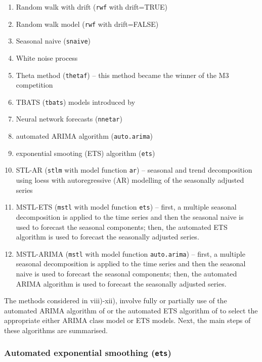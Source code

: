 \documentclass{monashthesis}
\begin{document}
\begin{enumerate}
\def\labelenumi{\roman{enumi})}
\tightlist
\item
  Random walk with drift (\texttt{rwf} with drift=TRUE)
\item
  Random walk model (\texttt{rwf} with drift=FALSE)
\item
  Seasonal naive (\texttt{snaive})
\item
  White noise process
\item
  Theta method (\texttt{thetaf}) -- this method became the winner of the M3 competition \autocite{makridakis2000m3}
\item
  TBATS (\texttt{tbats}) models introduced by \textcite{de2011forecasting}
\item
  Neural network forecasts (\texttt{nnetar})
\item
  automated ARIMA algorithm (\texttt{auto.arima})
\item
  exponential smooting (ETS) algorithm (\texttt{ets})
\item
  STL-AR (\texttt{stlm} with model function \texttt{ar}) -- seasonal and trend decomposition using loess with autoregressive (AR) modelling of the seasonally adjusted series
\item
  MSTL-ETS (\texttt{mstl} with model function \texttt{ets}) -- first, a multiple seasonal decomposition is applied to the time series and then the seasonal naive is used to forecast the seasonal components; then, the automated ETS algorithm is used to forecast the seasonally adjusted series.
\item
  MSTL-ARIMA (\texttt{mstl} with model function \texttt{auto.arima}) -- first, a multiple seasonal decomposition is applied to the time series and then the seasonal naive is used to forecast the seasonal components; then, the automated ARIMA algorithm is used to forecast the seasonally adjusted series.
\end{enumerate}

The methods considered in viii)-xii), involve fully or partially use of the automated ARIMA algorithm of \textcite{Hyndman2008} or the automated ETS algorithm of \textcite{Hyndman2002} to select the appropriate either ARIMA class model or ETS models. Next, the main steps of these algorithms are summarised.

\hypertarget{automated-exponential-smoothing-ets}{%
\subsubsection{\texorpdfstring{Automated exponential smoothing (\texttt{ets})}{Automated exponential smoothing (ets)}}\label{automated-exponential-smoothing-ets}}
\end{document}

